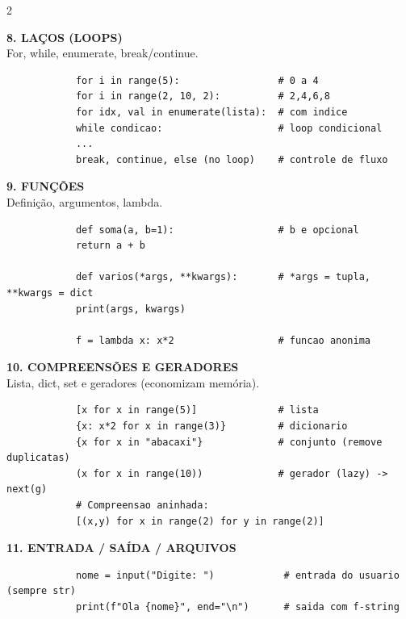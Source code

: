 \documentclass[a4paper]{article}
\begin{document}
\begin{multicols}{2}
		
		
		\columnbreak
		\noindent\textbf{8. LAÇOS (LOOPS)} \\
		For, while, enumerate, break/continue.
		\begin{lstlisting}
			for i in range(5):                 # 0 a 4
			for i in range(2, 10, 2):          # 2,4,6,8
			for idx, val in enumerate(lista):  # com indice
			while condicao:                    # loop condicional
			...
			break, continue, else (no loop)    # controle de fluxo
		\end{lstlisting}
		
		\noindent\textbf{9. FUNÇÕES} \\
		Definição, argumentos, lambda.
		\begin{lstlisting}
			def soma(a, b=1):                  # b e opcional
			return a + b
			
			def varios(*args, **kwargs):       # *args = tupla, **kwargs = dict
			print(args, kwargs)
			
			f = lambda x: x*2                  # funcao anonima
		\end{lstlisting}
		
		\noindent\textbf{10. COMPREENSÕES E GERADORES} \\
		Lista, dict, set e geradores (economizam memória).
		\begin{lstlisting}
			[x for x in range(5)]              # lista
			{x: x*2 for x in range(3)}         # dicionario
			{x for x in "abacaxi"}             # conjunto (remove duplicatas)
			(x for x in range(10))             # gerador (lazy) -> next(g)
			# Compreensao aninhada:
			[(x,y) for x in range(2) for y in range(2)]
		\end{lstlisting}
		
		\noindent\textbf{11. ENTRADA / SAÍDA / ARQUIVOS}
		\begin{lstlisting}
			nome = input("Digite: ")            # entrada do usuario (sempre str)
			print(f"Ola {nome}", end="\n")      # saida com f-string
			

\end{lstlisting}
\end{multicols}
\end{document}
